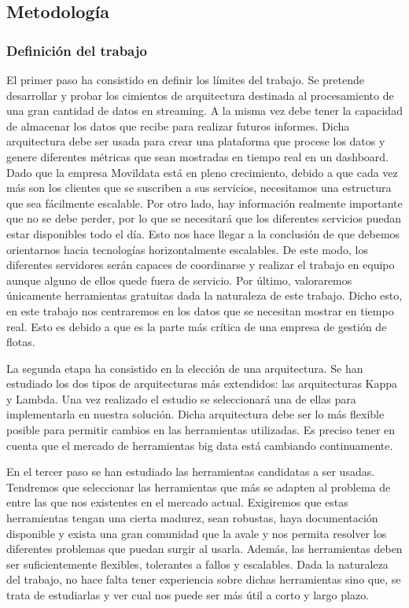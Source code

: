\subsection{Metodología\label{metodologia}}
\subsubsection{Definición del trabajo \label{etapasTrab}}
                   
El primer paso ha consistido en definir los límites del trabajo. Se pretende desarrollar y probar los cimientos de arquitectura destinada al procesamiento de una gran cantidad de datos en streaming. A la misma vez debe tener la capacidad de almacenar los datos que recibe para realizar futuros informes. Dicha arquitectura debe ser usada para crear una plataforma que procese los datos y genere diferentes métricas que sean mostradas en tiempo real en un dashboard. Dado que la empresa Movildata está en pleno crecimiento, debido a que cada vez más son los clientes que se suscriben a sus servicios, necesitamos una estructura que sea fácilmente escalable. Por otro lado, hay información realmente importante que no se debe perder, por lo que se necesitará que los diferentes servicios puedan estar disponibles todo el día. Esto nos hace llegar a la conclusión de que debemos orientarnos hacia tecnologías horizontalmente escalables. De este modo, los diferentes servidores serán capaces de coordinarse y realizar el trabajo en equipo aunque alguno de ellos quede fuera de servicio. Por último, valoraremos únicamente herramientas gratuitas dada la naturaleza de este trabajo. Dicho esto, en este trabajo nos centraremos en los datos que se necesitan mostrar en tiempo real. Esto es debido a que es la parte más crítica de una empresa de gestión de flotas.\par

La segunda etapa ha consistido en la elección de una arquitectura. Se han estudiado los dos tipos de arquitecturas más extendidos: las arquitecturas Kappa y Lambda\cite{LambdaKappa2}. Una vez realizado el estudio se seleccionará una de ellas para implementarla en nuestra solución. Dicha arquitectura debe ser lo más flexible posible para permitir cambios en las herramientas utilizadas. Es preciso tener en cuenta que el mercado de herramientas big data está cambiando continuamente.\par 

En el tercer paso se han estudiado las herramientas candidatas a ser usadas. Tendremos que seleccionar las herramientas que más se adapten al problema de entre las que nos existentes en el mercado actual. Exigiremos que estas herramientas tengan una cierta madurez, sean robustas, haya documentación disponible y exista una gran comunidad que la avale y nos permita resolver los diferentes problemas que puedan surgir al usarla. Además, las herramientas deben ser suficientemente flexibles, tolerantes a fallos y escalables. Dada la naturaleza del trabajo, no hace falta tener experiencia sobre dichas herramientas sino que, se trata de estudiarlas y ver cual nos puede ser más útil a corto y largo plazo.\par

